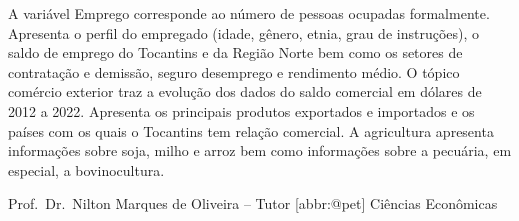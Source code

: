 \documentclass[
]{article}
\begin{document}
\begin{center}
\begin{minipage}{.7\linewidth}
A variável Emprego corresponde ao número de pessoas ocupadas
formalmente. Apresenta o perfil do empregado (idade, gênero, etnia, grau
de instruções), o saldo de emprego do Tocantins e da Região Norte bem
como os setores de contratação e demissão, seguro desemprego e
rendimento médio. O tópico comércio exterior traz a evolução dos dados
do saldo comercial em dólares de 2012 a 2022. Apresenta os principais
produtos exportados e importados e os países com os quais o Tocantins
tem relação comercial. A agricultura apresenta informações sobre soja,
milho e arroz bem como informações sobre a pecuária, em especial, a
bovinocultura.

\hfill\break
Prof.~Dr.~Nilton Marques de Oliveira -- Tutor {[}abbr:@pet{]} Ciências
Econômicas

\end{minipage}

\end{center}

\thispagestyle{empty}
\twocolumn
{}
\end{document}
